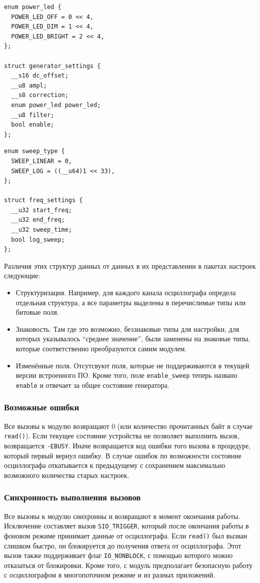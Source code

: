\documentclass[a4paper,12pt]{report}
\numberwithin{equation}{section}
\begin{document}
\begin{lstlisting}[float=h!,label=struct:gen,caption={Структура параметров
    генератора}]
enum power_led {
  POWER_LED_OFF = 0 << 4,
  POWER_LED_DIM = 1 << 4,
  POWER_LED_BRIGHT = 2 << 4,
};

struct generator_settings {
  __s16 dc_offset;
  __u8 ampl;
  __s8 correction;
  enum power_led power_led;
  __u8 filter;
  bool enable;
};
\end{lstlisting}

\begin{lstlisting}[float=h!,label=struct:freq,caption={Структура регистров
    генератора}]
enum sweep_type {
  SWEEP_LINEAR = 0,
  SWEEP_LOG = ((__u64)1 << 33),
};

struct freq_settings {
  __u32 start_freq;
  __u32 end_freq;
  __u32 sweep_time;
  bool log_sweep;
};
\end{lstlisting}

Различия этих структур данных от данных в их представлении в пакетах настроек
следующие:
\begin{itemize}
\item Структуризация. Например, для каждого канала осциллографа определа
  отдельная структура, а все параметры выделены в перечислимые типы или битовые
  поля.
\item Знаковость. Там где это возможно, беззнаковые типы для настройки, для
  которых указывалось ``среднее значение'', были заменены на знаковые типы,
  которые соответственно преобразуются самим модулем.
\item Изменённые поля. Отсутсвуют поля, которые не поддерживаются в текущей
  версии встроенного ПО. Кроме того, поле \texttt{enable\_sweep} теперь названо
  \texttt{enable} и отвечает за общее состояние генератора.
\end{itemize}

\subsubsection{Возможные ошибки}
Все вызовы к модулю возвращают 0 (или количество прочитанных байт в случае
\texttt{read()}). Если текущее состояние устройства не позволяет выполнить
вызов, возвращается \texttt{-EBUSY}. Иначе возвращается код ошибки того вызова в
процедуре, который первый вернул ошибку. В случае ошибок по возможности
состояние осциллографа откатывается к предыдущему с сохранением максимально
возможного количества старых настроек.

\subsubsection{Синхронность выполнения вызовов}
Все вызовы к модулю синхронны и возвращают в момент окончания
работы. Исключение составляет вызов \texttt{SIO\_TRIGGER}, который после
окончания работы в фоновом режиме принимает данные от осциллографа. Если
\texttt{read()} был вызван слишком быстро, он блокируется до получения ответа от
осциллографа. Этот вызов также поддерживает флаг \texttt{IO\_NONBLOCK}, с помощью
которого можно отказаться от блокировки. Кроме того, с модуль предполагает
безопасную работу с осциллографом в многопоточном режиме и из разных приложений.
\end{document}
